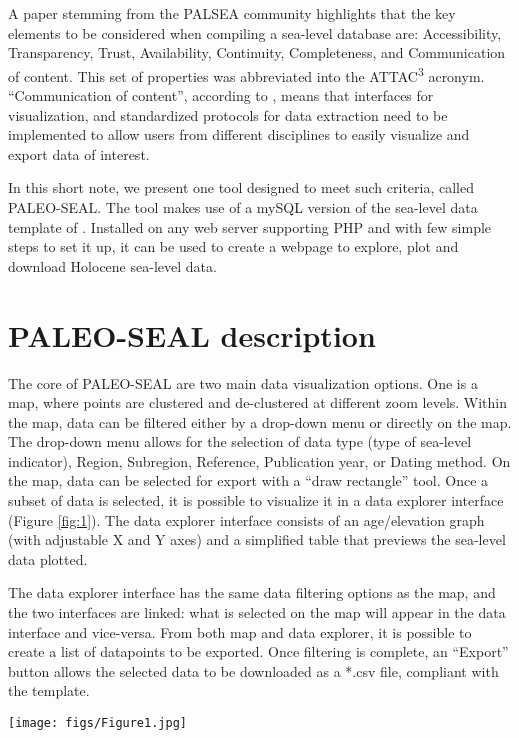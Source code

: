 \documentclass[a4paper,fleqn]{cas-dc}
\begin{document}
A paper stemming from the PALSEA community \citep{dusterhus2016} highlights that the key elements to be considered when compiling a sea-level database are: Accessibility, Transparency, Trust, Availability, Continuity, Completeness, and Communication of content. This set of properties was abbreviated into the ATTAC\textsuperscript{3} acronym. ``Communication of content'',  according to \citet{dusterhus2016}, means that interfaces for visualization, and standardized protocols for data extraction need to be implemented to allow users from different disciplines to easily visualize and export data of interest. 

In this short note, we present one tool designed to meet such criteria, called PALEO-SEAL. The tool makes use of a mySQL version of the sea-level data template of \citet{khan2019}. Installed on any web server supporting PHP and with few simple steps to set it up, it can be used to create a webpage to explore, plot and download Holocene sea-level data. 

\section{PALEO-SEAL description}
The core of PALEO-SEAL are two main data visualization options. One is a map, where points are clustered and de-clustered at different zoom levels. Within the map, data can be filtered either by a drop-down menu or directly on the map. The drop-down menu allows for the selection of data type (type of sea-level indicator), Region, Subregion, Reference, Publication year, or Dating method. On the map, data can be selected for export with a ``draw rectangle'' tool. Once a subset of data is selected, it is possible to visualize it in a data explorer interface (Figure \ref{fig:1}). The data explorer interface consists of an age/elevation graph (with adjustable X and Y axes) and a simplified table that previews the sea-level data plotted. 

The data explorer interface has the same data filtering options as the map, and the two interfaces are linked: what is selected on the map will appear in the data interface and vice-versa. From both map and data explorer, it is possible to create a list of datapoints to be exported. Once filtering is complete, an ``Export'' button allows the selected data to be downloaded as a *.csv file, compliant with the \citet{khan2019} template.

\begin{figure*}
	\centering
	\texttt{[image: figs/Figure1.jpg]}
	\caption{Screenshots of the maps and data explorer interfaces in PALEO-SEAL.}
	\label{fig:1}
\end{figure*}
\end{document}
